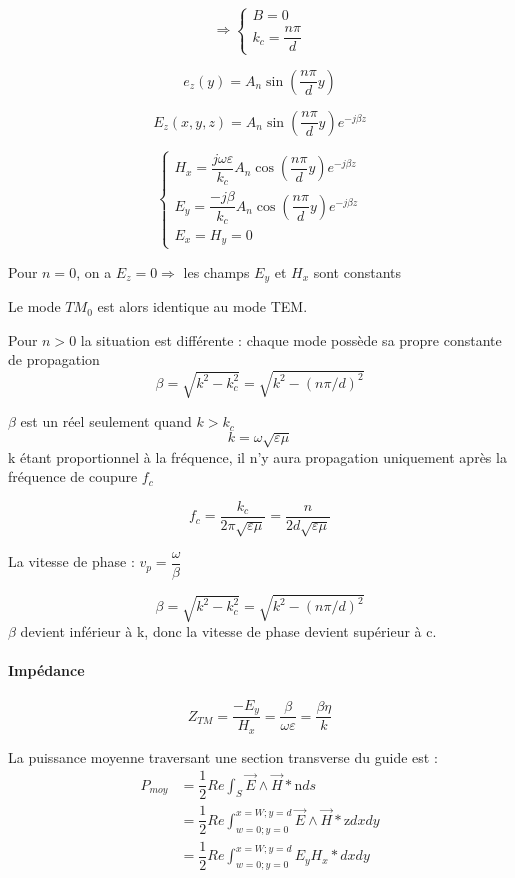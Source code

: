 \documentclass[12pt,a4paper]{report}
\begin{document}
\[
	\Rightarrow \left \lbrace \begin{array}{l}
	B=0\\
	k_c = \dfrac{n\pi}{d}	
	\end{array}
	\right .
\]

\[
	e_z(y) = A_n \sin\left ( \dfrac{n\pi}{d}y\right )
\]

\[
	E_z (x,y,z) = A_n \sin\left ( \dfrac{n\pi}{d}y\right )e^{-j\beta z}
\]

\[
	\left \lbrace \begin{array}{l}
	H_x = \dfrac{j\omega \varepsilon}{k_c} A_n \cos \left (\dfrac{n\pi}{d}y\right ) e^{-j\beta z}\\
	E_y = \dfrac{-j\beta}{k_c} A_n \cos \left ( \dfrac{n\pi}{d} y \right ) e^{-j \beta z}\\
	E_x = H_y = 0
	\end{array}
	\right.
\]

Pour \(n = 0\), on a \(E_z = 0 \Rightarrow\) les champs \(E_y\) et \(H_x\) sont constants

Le mode \(TM_0\) est alors identique au mode TEM.

Pour \(n>0\) la situation est différente : chaque mode possède sa propre constante de propagation
\[
	\beta = \sqrt{k^2 - k_c^2} = \sqrt{k^2 - (n\pi/d)^2}
\]

\(\beta\) est un réel seulement quand \(k > k_c\)
\[
	k = \omega \sqrt{\varepsilon \mu}
\]
k étant proportionnel à la fréquence, il n'y aura propagation uniquement après la fréquence de coupure \(f_c\)

\[
	f_c = \dfrac{k_c}{2\pi\sqrt{\varepsilon \mu}} = \dfrac{n}{2d \sqrt{\varepsilon \mu}}
\]

La vitesse de phase : \(v_p = \dfrac{\omega}{\beta}\)

\[
	\beta = \sqrt{k^2 - k_c^2} = \sqrt{k^2 - (n\pi/d)^2}
\]
\(\beta\) devient inférieur à k, donc la vitesse de phase devient supérieur à c.

\paragraph{Impédance}\quad

\[
	Z_{TM} = \dfrac{-E_y}{H_x} = \dfrac{\beta}{\omega \varepsilon} = \dfrac{\beta \eta}{k}
\]

La puissance moyenne traversant une section transverse du guide est :
\begin{align*}
	P_{moy} &= \dfrac{1}{2} Re \int_S \vec{E} \wedge \vec{H}* \text{\^n} ds\\
	&= \dfrac{1}{2} Re \int_{w=0; y=0}^{x=W; y=d}\vec{E} \wedge \vec{H}* \text{\^z} dxdy\\
	&= \dfrac{1}{2} Re \int_{w=0; y=0}^{x=W; y=d} E_y H_x* dxdy
\end{align*}
\end{document}
